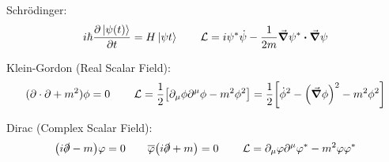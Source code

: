 Schrödinger:
\begin{equation*}
    i\hbar\pdv{\ket{\psi(t)}}{t} = H\ket{\psi{t}}
    \qquad
    \Lc = i\psi^*\dot{\psi} - \frac{1}{2m}\grad{\psi^*}\vdot\grad{\psi}
\end{equation*}

Klein-Gordon (Real Scalar Field):
\begin{equation*}
    (\partial\cdot\partial + m^2)\phi = 0
    \qquad
    \operatorname{\mathcal{L}}
    = \frac{1}{2}\qty[\partial_\mu\phi\partial^\mu\phi - m^2\phi^2]
    = \frac{1}{2}\qty[\dot{\phi}^2 - \qty(\grad{\phi})^2 - m^2\phi^2]
\end{equation*}

Dirac (Complex Scalar Field):
\begin{equation*}
    \qty(i\slashed{\partial}-m)\varphi = 0
    \qquad
    \overline{\varphi}\qty(i\slashed{\partial}+m) = 0
    \qquad
    \operatorname{\mathcal{L}}
    = \partial_\mu\varphi\partial^\mu\varphi^* - m^2\varphi\varphi^*
\end{equation*}
